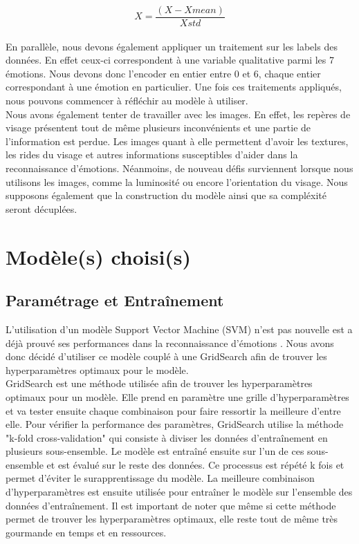 \documentclass{rapport}
\begin{document}
\begin{equation}
    X = \frac{(X - Xmean)} {Xstd}
\end{equation}\\

En parallèle, nous devons également appliquer un traitement sur les labels des données.
En effet ceux-ci correspondent à une variable qualitative parmi les 7 émotions.
Nous devons donc l'encoder en entier entre 0 et 6, chaque entier correspondant à une émotion en particulier.
Une fois ces traitements appliqués, nous pouvons commencer à réfléchir au modèle à utiliser.\\

Nous avons également tenter de travailler avec les images.
En effet, les repères de visage présentent tout de même plusieurs inconvénients et une partie de l'information est perdue.
Les images quant à elle permettent d'avoir les textures,
les rides du visage et autres informations susceptibles d'aider dans la reconnaissance d'émotions.
Néanmoins, de nouveau défis surviennent lorsque nous utilisons les images, comme la luminosité ou encore l'orientation du visage.
Nous supposons également que la construction du modèle ainsi que sa compléxité seront décuplées.

\section{Modèle(s) choisi(s)}
\subsection{Paramétrage et Entraînement}

L'utilisation d'un modèle Support Vector Machine (SVM) n'est pas nouvelle est a déjà prouvé ses performances dans la reconnaissance
d'émotions \cite{kalapalaFacialExpressionRecognition2020}. Nous avons donc décidé d'utiliser ce modèle couplé à une GridSearch
afin de trouver les hyperparamètres optimaux pour le modèle.\\

GridSearch est une méthode utilisée afin de trouver les hyperparamètres optimaux pour un modèle. Elle prend en paramètre une grille
d'hyperparamètres et va tester ensuite chaque combinaison pour faire ressortir la meilleure d'entre elle. Pour vérifier la performance
des paramètres, GridSearch utilise la méthode "k-fold cross-validation" qui consiste à diviser les données d'entraînement en plusieurs
sous-ensemble. Le modèle est entraîné ensuite sur l'un de ces sous-ensemble et est évalué sur le reste des données. Ce processus est répété
k fois et permet d'éviter le surapprentissage du modèle. La meilleure combinaison d'hyperparamètres est ensuite utilisée pour entraîner le modèle
sur l'ensemble des données d'entraînement. Il est important de noter que même si cette méthode permet de trouver les hyperparamètres optimaux, elle
reste tout de même très gourmande en temps et en ressources.\\
\end{document}

